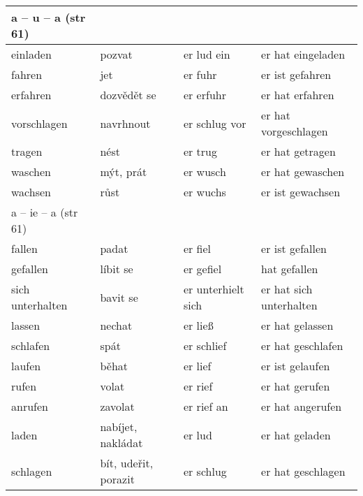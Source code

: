 \documentclass{article}
\begin{document}
\begin{tabular}{ p{3cm}|p{3cm}|p{3cm}|p{4cm}  }
    a -- u -- a (str 61)\\
    \hline
    einladen & pozvat & er lud ein & er hat eingeladen \\
    fahren & jet & er fuhr & er ist gefahren \\
    erfahren & dozvědět se & er erfuhr & er hat erfahren \\
    vorschlagen & navrhnout & er schlug vor & er hat vorgeschlagen \\
    tragen & nést & er trug & er hat getragen \\
    waschen & mýt, prát & er wusch & er hat gewaschen \\
    wachsen & růst & er wuchs & er ist gewachsen \\
    \hline
    a -- ie -- a (str 61)\\
    \hline
    fallen & padat & er fiel & er ist gefallen \\
    gefallen & líbit se & er gefiel & hat gefallen \\
    sich unterhalten & bavit se & er unterhielt sich & er hat sich unterhalten \\
    lassen & nechat & er lie{\ss} & er hat gelassen \\
    schlafen & spát & er schlief & er hat geschlafen \\
    laufen & běhat & er lief & er ist gelaufen \\
    rufen & volat & er rief & er hat gerufen \\
    anrufen & zavolat & er rief an & er hat angerufen \\
    laden & nabíjet, nakládat & er lud & er hat geladen \\
    schlagen & bít, udeřit, porazit & er schlug & er hat geschlagen \\
    \end{tabular}


    
\end{document}
